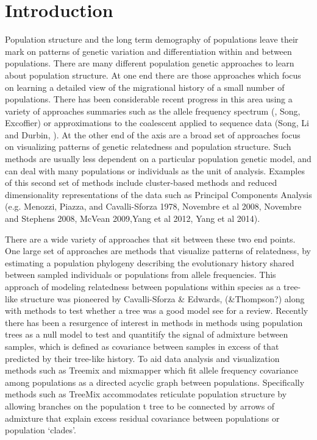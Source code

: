 \documentclass[12pt]{article}
\begin{document}
\section*{Introduction}
Population structure and the long term demography of populations leave their mark on patterns of genetic variation and differentiation within and between populations. 
There are many different population genetic approaches to learn about population structure. At one end there are those approaches which focus on learning a detailed view of the migrational history of a small number of populations. There has been considerable recent progress in this area using a variety of approaches summaries such as the allele frequency spectrum (\citep{dadi}, Song, Excoffier) or approximations to the coalescent applied to sequence data (Song, Li and Durbin, ). At the other end of the axis are a broad set of approaches focus on visualizing patterns of genetic relatedness and population structure. Such methods are usually less dependent on a particular population genetic model, and can deal with many populations or individuals as the unit of analysis. Examples of this second set of methods include cluster-based methods \citep{STRUCTURE, ADMIXTURE, FINESTRUCTURE} and reduced dimensionality representations of the data such as Principal Components Analysis (e.g. Menozzi, Piazza, and Cavalli-Sforza 1978, Novembre et al 2008, Novembre and Stephens 2008, McVean 2009,Yang et al 2012, Yang et al 2014).

There are a wide variety of approaches that sit between these two end points. One large set of approaches are methods that visualize patterns of relatedness, by estimating a population phylogeny describing the evolutionary history shared between sampled individuals or populations from allele frequencies.  This approach of modeling relatedness between populations within species as a tree-like structure was pioneered by Cavalli-Sforza \& Edwards,  (\&Thompson?) along with methods to test whether a tree was a good model \citep{treeness} see  \citep{Felsenstein} for a review. 
Recently there has been a resurgence of interest in methods in methods using population trees as a null model to test and quantitify the signal of admixture between samples, which is defined as covariance between samples in excess of that predicted by their tree-like history. To aid data analysis and visualization methods such as Treemix \citep{Pickrell} and mixmapper which fit allele frequency covariance among populations as a directed acyclic graph between populations. Specifically methods such as TreeMix accommodates reticulate population structure by allowing branches on the population t tree to be connected by arrows of admixture that explain excess residual covariance between populations or population `clades'.
\end{document}
